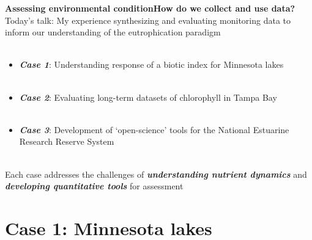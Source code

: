 \documentclass[serif]{beamer}\usepackage[]{graphicx}\usepackage[]{color}
\newcommand{\emtxt}[1]{\textbf{\textit{#1}}}
\begin{document}
\begin{frame}{\textbf{Assessing environmental condition}}{\textbf{How do we collect and use data?}}
\onslide<+->
Today's talk: My experience synthesizing and evaluating monitoring data to inform our understanding of the eutrophication paradigm\\~\\
\begin{itemize}
\item \emtxt{Case 1}: Understanding response of a biotic index for Minnesota lakes \\~\\
\item \emtxt{Case 2}: Evaluating long-term datasets of chlorophyll in Tampa Bay \\~\\
\item \emtxt{Case 3}: Development of `open-science' tools for the National Estuarine Research Reserve System \\~\\
\end{itemize}
\onslide<+->
Each case addresses the challenges of \emtxt{understanding nutrient dynamics} and \emtxt{developing quantitative tools} for assessment
\end{frame}

\section{Case 1: Minnesota lakes}
\end{document}
